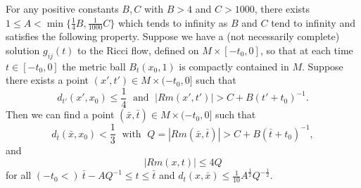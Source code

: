 \begin{lemma}
  \label{lem:cz-parabolic-point-picking-curvature-control}

For any positive constants $B, C$ with $B>4$ and $C>1000$, there
exists $1\leq A<\min\{\frac{1}{4}B,\frac{1}{1000}C\}$ which tends
to infinity as $B$ and $C$ tend to infinity and satisfies the
following property. Suppose we have a (not necessarily complete)
solution $g_{ij}(t)$ to the Ricci flow, defined on $M\times
[-t_0,0]$, so that at each time $t\in [-t_0,0]$ the metric ball
$B_t(x_0,1)$ is compactly contained in $M$. Suppose there exists a
point $(x',t') \in M\times (-t_0,0]$ such that
$$
d_{t'}(x',x_0)\leq \frac{1}{4} \; \mbox{ and }\;
|Rm(x',t')|>C+B(t'+t_0)^{-1}.
$$
Then we can find a point $(\bar{x},\bar{t}) \in M\times (-t_0,0]$
such that
$$
d_{\bar{t}}(\bar{x},x_0)<\frac{1}{3}\; \mbox{ with }\; Q
=|Rm(\bar{x},\bar{t})|>C+ B(\bar{t}+t_0)^{-1},
$$
and
$$
|Rm(x,t)|\leq 4Q
$$
for all $(-t_0<) \ \bar{t}-AQ^{-1}\leq t\leq \bar{t}$ and
$d_t(x,\bar{x})\leq \frac{1}{10}A^{\frac{1}{2}}Q^{-\frac{1}{2}}.$
\end{lemma}

